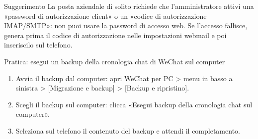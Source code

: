 \begin{tcbinfo}{Suggerimento}
La posta aziendale di solito richiede che l'amministratore attivi una «password di autorizzazione client» o un «codice di autorizzazione IMAP/SMTP»: non puoi usare la password di accesso web. Se l'accesso fallisce, genera prima il codice di autorizzazione nelle impostazioni webmail e poi inseriscilo sul telefono.

\end{tcbinfo}

\begin{tcbpractice}{Pratica: esegui un backup della cronologia chat di WeChat sul computer}
\begin{enumerate}
  \item Avvia il backup dal computer: apri WeChat per PC > menu in basso a sinistra > [Migrazione e backup] > [Backup e ripristino].
  \item Scegli il backup sul computer: clicca «Esegui backup della cronologia chat sul computer».
  \item Seleziona sul telefono il contenuto del backup e attendi il completamento.
\end{enumerate}

\end{tcbpractice}
